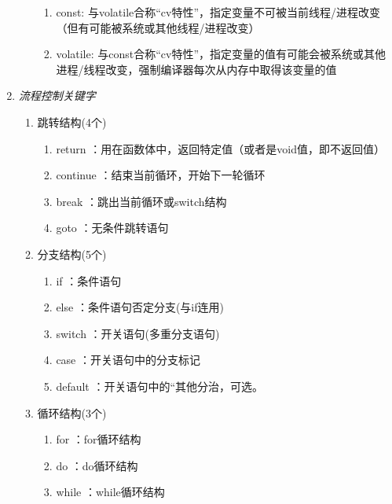 \begin{enumerate}[label=\arabic*)]
\begin{enumerate}
\begin{enumerate}
			\item const: 与volatile合称“cv特性”，指定变量不可被当前线程/进程改变（但有可能被系统或其他线程/进程改变）
			\item volatile: 与const合称“cv特性”，指定变量的值有可能会被系统或其他进程/线程改变，强制编译器每次从内存中取得该变量的值
		\end{enumerate}	
	\end{enumerate}
	\item \textit{流程控制关键字}
	\begin{enumerate}
		\item 跳转结构(4个)
		\begin{enumerate}
			\item return ：用在函数体中，返回特定值（或者是void值，即不返回值）
			\item continue ：结束当前循环，开始下一轮循环
			\item break ：跳出当前循环或switch结构
			\item goto ：无条件跳转语句
		\end{enumerate}
		\item 分支结构(5个)
		\begin{enumerate}
			\item if ：条件语句
			\item else ：条件语句否定分支(与if连用)
			\item switch ：开关语句(多重分支语句)
			\item case ：开关语句中的分支标记
			\item default ：开关语句中的``其他分治，可选。
		\end{enumerate}
		\item 循环结构(3个)
		\begin{enumerate}
			\item for ：for循环结构
			\item do ：do循环结构
			\item while ：while循环结构
		\end{enumerate}	
	\end{enumerate}
\end{enumerate}


   




